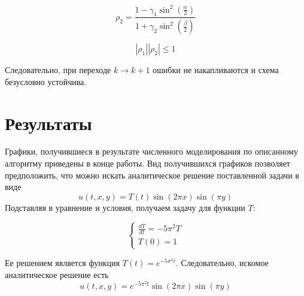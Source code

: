 \documentclass[12pt]{article}
\begin{document}
		$$\rho_2 = \frac{1 - \gamma_1 \sin^2 \left( \frac{\alpha}{2} \right)}{1 + \gamma_2 \sin^2 \left( \frac{\beta}{2} \right)}$$
		
		$$|\rho_1||\rho_2| \le 1$$
		
		Следовательно, при переходе $k \rightarrow k+1$ ошибки не накапливаются и схема безусловно устойчива.
	\section{Результаты}
		Графики, получившиеся в результате численного моделирования по описанному алгоритму приведены в конце работы.
		Вид получившихся графиков позволяет предположить, что можно искать аналитическое решение поставленной задачи в виде
		$$u(t,x,y) = T(t)\sin(2 \pi x) \sin(\pi y)$$
		Подставляя в уравнение и условия, получаем задачу для функции $T$:
		
		\begin{equation}
			\begin{cases}
				\frac{dT}{dt} = -5 \pi^2 T \\
				T(0) = 1
			\end{cases}
		\end{equation}
		
		Ее решением является функция $T(t) = e^{-5\pi^2t}$. Следовательно, искомое аналитическое решение есть
		$$u(t,x,y) = e^{-5\pi^2 t}\sin(2\pi x) \sin(\pi y)$$
		
\end{document}
